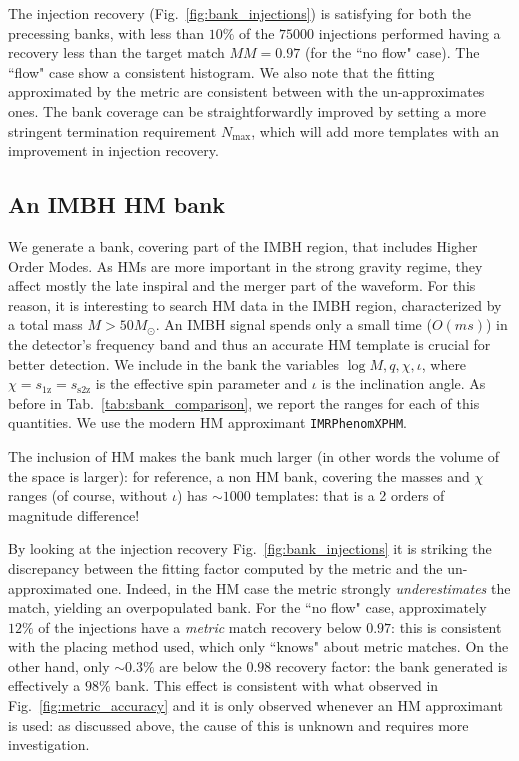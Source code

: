 \documentclass[twocolumn,showpacs,preprintnumbers,nofootinbib,prd,
superscriptaddress,10pt]{revtex4-2}
\begin{document}
The injection recovery (Fig.~\ref{fig:bank_injections}) is satisfying for both the precessing banks, with less than $10\%$ of the $75000$ injections performed having a recovery less than the target match $MM = 0.97$ (for the ``no flow" case). The ``flow" case show a consistent histogram.
We also note that the fitting approximated by the metric are consistent between with the un-approximates ones.
The bank coverage can be straightforwardly improved by setting a more stringent termination requirement $N_\text{max}$, which will add more templates with an improvement in injection recovery.

\subsection{An IMBH HM bank}\label{sec:HM_bank}

We generate a bank, covering part of the IMBH region, that includes Higher Order Modes. As HMs are more important in the strong gravity regime, they affect mostly the late inspiral and the merger part of the waveform.
For this reason, it is interesting to search HM data in the IMBH region, characterized by a total mass $M>50 M_\odot$. An IMBH signal spends only a small time ($O(ms)$) in the detector's frequency band and thus an accurate HM template is crucial for better detection.
We include in the bank the variables $\log M, q, \chi, \iota$, where $\chi=s_\text{1z}=s_\text{s2z}$ is the effective spin parameter and $\iota$ is the inclination angle.
As before in Tab.~\ref{tab:sbank_comparison}, we report the ranges for each of this quantities. We use the modern HM approximant \texttt{IMRPhenomXPHM}.

The inclusion of HM makes the bank much larger (in other words the volume of the space is larger): for reference, a non HM bank, covering the masses and $\chi$ ranges (of course, without $\iota$) has $\sim 1000$ templates: that is a 2 orders of magnitude difference!

By looking at the injection recovery Fig.~\ref{fig:bank_injections} it is striking the discrepancy between the fitting factor computed by the metric and the un-approximated one. Indeed, in the HM case the metric strongly {\it underestimates} the match, yielding an overpopulated bank. For the ``no flow" case, approximately $12\%$ of the injections have a {\it metric} match recovery below $0.97$: this is consistent with the placing method used, which only ``knows" about metric matches. On the other hand, only $\sim 0.3\%$ are below the $0.98$ recovery factor: the bank generated is effectively a $98\%$ bank.
This effect is consistent with what observed in Fig.~\ref{fig:metric_accuracy} and it is only observed whenever an HM approximant is used: as discussed above, the cause of this is unknown and requires more investigation.
\end{document}
